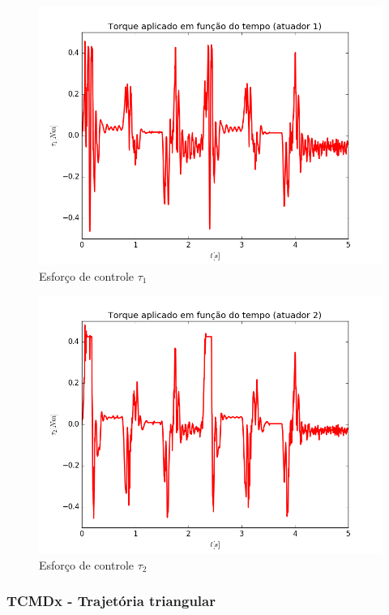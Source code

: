 \documentclass[]{politex}
\begin{document}
\begin{multicols}{2}
\begin{figure}[H]
	\centering
	\includegraphics[scale=0.39]{../../../Experimental/Aquisicoes/CTCx_triangulo/tau1.png}  
	\caption{Esforço de controle $\tau_1$}
	\label{fig:CTCx_triangulo_tau1}
\end{figure}
\begin{figure}[H]
	\centering
	\includegraphics[scale=0.39]{../../../Experimental/Aquisicoes/CTCx_triangulo/tau2.png}  
	\caption{Esforço de controle $\tau_2$}
	\label{fig:CTCx_triangulo_tau2}
\end{figure}
\end{multicols}

\subsubsection{TCMDx - Trajetória triangular}
\end{document}
